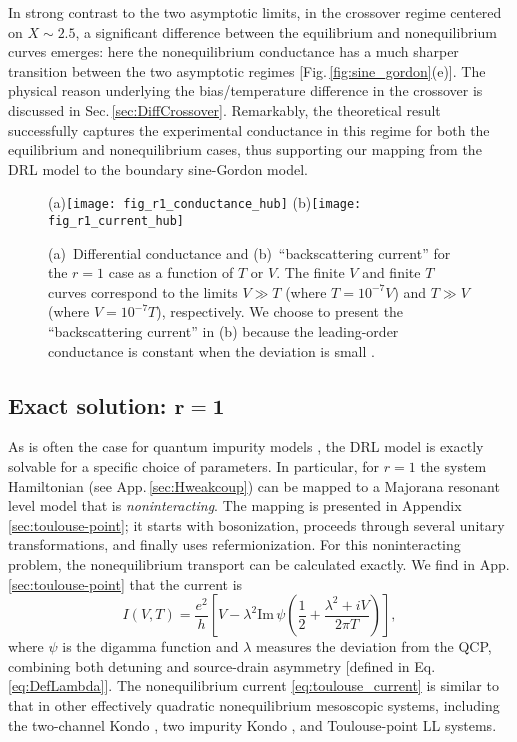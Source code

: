\documentclass[aps,prb,reprint,floatfix,superscriptaddress,amssymb,amsmath]{revtex4-2}
\begin{document}
In strong contrast to the two asymptotic limits, in the crossover regime centered on $X \!\sim\! 2.5$, a significant difference between the equilibrium and nonequilibrium curves emerges: here the nonequilibrium conductance has a much sharper transition between the two asymptotic regimes [Fig.\,\ref{fig:sine_gordon}(e)]. The physical reason underlying the bias/temperature difference in the crossover is discussed in Sec.\,\ref{sec:DiffCrossover}. Remarkably, the theoretical result successfully captures the experimental conductance in this regime for both the equilibrium and nonequilibrium cases, thus supporting our mapping from the DRL model to the boundary sine-Gordon model.


\begin{figure}[t]
(a)\texttt{[image: fig\_r1\_conductance\_hub]}
(b)\texttt{[image: fig\_r1\_current\_hub]}
\caption{\label{fig:toulouse_point} 
(a)~Differential conductance and (b)~``backscattering current'' for the $r\!=\!1$ case as a function of $T$ or $V$.  
The finite $V$ and finite $T$ curves correspond to the limits $V\!\gg\! T$ (where $T\!=\!10^{-7} V$) and $T\!\gg\! V$ (where $V\!=\!10^{-7} T$), respectively. We choose to present the ``backscattering current'' in (b) because the leading-order conductance is constant when the deviation is small \cite{RedAbove}.}
\end{figure}


\subsection{Exact solution: $\mathbf{r\!=\!1}$}
\label{sec:exact_expressions}

As is often the case for quantum impurity models \cite{GogolinBook}, the DRL model is exactly solvable for a specific choice of parameters.  In particular, for $r\!=\!1$ the system Hamiltonian (see App.\,\ref{sec:Hweakcoup}) can be mapped to a  Majorana resonant level model that is \emph{noninteracting}. The mapping is presented in Appendix \ref{sec:toulouse-point}; it starts with bosonization, proceeds through several unitary transformations, and finally uses refermionization. For this noninteracting problem, the nonequilibrium transport can be calculated exactly. We find in App.\,\ref{sec:toulouse-point} that the current is  
\begin{equation}
I(V,T) =  \frac{e^2}{h}\left[ V -\lambda^2
\text{Im}\,\psi \left(\frac{1}{2}+\frac{\lambda^{2}+iV}{2\pi T} \right)\right] ,
\label{eq:toulouse_current}
\end{equation}
where $\psi$ is the digamma function and $\lambda$ measures the deviation from the QCP, combining both detuning and source-drain asymmetry [defined in Eq.\,\eqref{eq:DefLambda}]. 
The nonequilibrium current \eqref{eq:toulouse_current} is similar to that in other effectively quadratic nonequilibrium mesoscopic systems, including the two-channel Kondo \cite{MitchellSelaCrossoverPRB12}, two impurity Kondo \cite{SelaExactTransPRL09}, and Toulouse-point LL \cite{KaneFisherPRB92} systems. 
\end{document}

